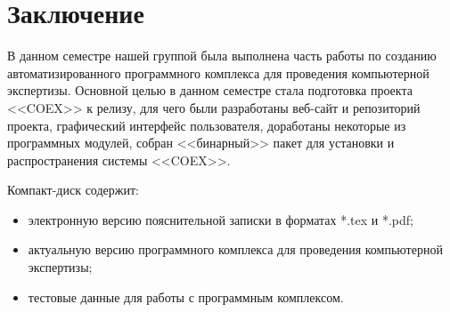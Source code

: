 \newpage
\section*{Заключение}
В данном семестре нашей группой была выполнена часть работы по созданию автоматизированного программного комплекса для проведения компьютерной экспертизы. Основной целью в данном семестре стала подготовка проекта <<COEX>> к релизу, для чего были разработаны веб-сайт и репозиторий проекта, графический интерфейс пользователя, доработаны некоторые из программных модулей, собран <<бинарный>> пакет для установки и распространения системы <<COEX>>. 
 
 
 \newpage
 \renewcommand{\refname}{Список использованных источников}
 

 Компакт-диск содержит: 
 \begin{itemize}
 \item электронную версию пояснительной записки в форматах *.tex и *.pdf;
 \item актуальную версию программного комплекса для проведения компьютерной экспертизы;
 \item тестовые данные для работы с программным комплексом.
 \end{itemize}
 

